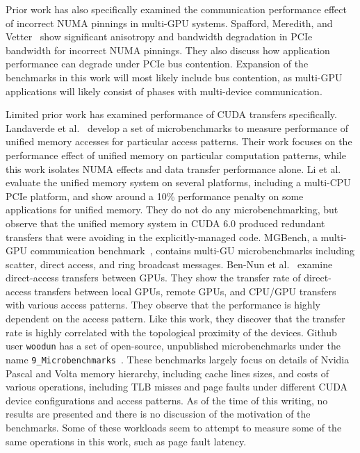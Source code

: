 Prior work has also specifically examined the communication performance effect of incorrect NUMA pinnings in multi-GPU systems.
Spafford, Meredith, and Vetter~\cite{spafford2011quantifying} show significant anisotropy and bandwidth degradation in PCIe bandwidth for incorrect NUMA pinnings.
They also discuss how application performance can degrade under PCIe bus contention.
Expansion of the benchmarks in this work will most likely include bus contention, as multi-GPU applications will likely consist of phases with multi-device communication.

Limited prior work has examined performance of CUDA transfers specifically.
Landaverde et al.~\cite{landaverde2014investigation} develop a set of microbenchmarks to measure performance of unified memory accesses for particular access patterns.
Their work focuses on the performance effect of unified memory on particular computation patterns, while this work isolates  NUMA effects and data transfer performance alone.
Li et al.~\cite{li2015evaluation} evaluate the unified memory system on several platforms, including a multi-CPU PCIe platform, and show around a 10\% performance penalty on some applications for unified memory.
They do not do any microbenchmarking, but observe that the unified memory system in CUDA 6.0 produced redundant transfers that were avoiding in the explicitly-managed code.
MGBench, a multi-GPU communication benchmark~\cite{bennun2016mgbench}, contains multi-GU microbenchmarks including scatter, direct access, and ring broadcast messages.
Ben-Nun et al.~\cite{ben2017groute} examine direct-access transfers between GPUs.
They show the transfer rate of direct-access transfers between local GPUs, remote GPUs, and CPU/GPU transfers with various access patterns.
They observe that the performance is highly dependent on the access pattern.
Like this work, they discover that the transfer rate is highly correlated with the topological proximity of the devices.
Github user \texttt{woodun} has a set of open-source, unpublished microbenchmarks under the name \texttt{9\_Microbenchmarks}~\cite{woodun2018microbenchmarks}.
These benchmarks largely focus on details of Nvidia Pascal and Volta memory hierarchy, including cache lines sizes, and costs of various operations, including TLB misses and page faults under different CUDA device configurations and access patterns.
As of the time of this writing, no results are presented and there is no discussion of the motivation of the benchmarks.
Some of these workloads seem to attempt to measure some of the same operations in this work, such as page fault latency.


